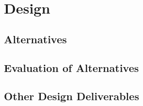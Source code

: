 \chapter{Design}
\section{Alternatives}
\section{Evaluation of Alternatives}
\section{Other Design Deliverables}